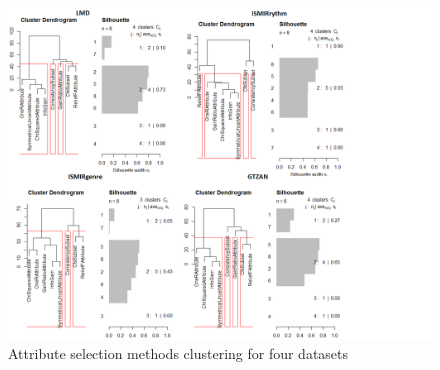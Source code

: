 \begin{figure}[p]
\begin{center}
\includegraphics[scale=0.5]{diagram_all.png}
\caption{Attribute selection methods clustering for four datasets
\label{fig:clustering}}
\end{center}
\end{figure}
